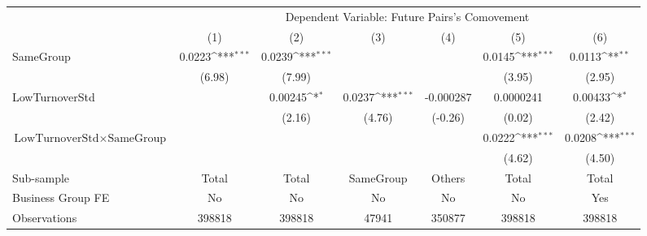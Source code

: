 {
\def\sym#1{\ifmmode^{#1}\else\(^{#1}\)\fi}
\begin{tabular}{l*{6}{c}}
\hline\hline
                &\multicolumn{6}{c}{Dependent Variable:  Future Pairs's Comovement}                                               \\\cmidrule(lr){2-7}
                &\multicolumn{1}{c}{(1)}         &\multicolumn{1}{c}{(2)}         &\multicolumn{1}{c}{(3)}         &\multicolumn{1}{c}{(4)}         &\multicolumn{1}{c}{(5)}         &\multicolumn{1}{c}{(6)}         \\
\hline
SameGroup       &   0.0223\sym{***}&   0.0239\sym{***}&                  &                  &   0.0145\sym{***}&   0.0113\sym{**} \\
                &   (6.98)         &   (7.99)         &                  &                  &   (3.95)         &   (2.95)         \\
[1em]
LowTurnoverStd  &                  &  0.00245\sym{*}  &   0.0237\sym{***}&-0.000287         &0.0000241         &  0.00433\sym{*}  \\
                &                  &   (2.16)         &   (4.76)         &  (-0.26)         &   (0.02)         &   (2.42)         \\
[1em]
$ {\text{LowTurnoverStd} } \times {\text{SameGroup} }  $ &                  &                  &                  &                  &   0.0222\sym{***}&   0.0208\sym{***}\\
                &                  &                  &                  &                  &   (4.62)         &   (4.50)         \\
\hline
Sub-sample      &    Total         &    Total         &SameGroup         &   Others         &    Total         &    Total         \\
Business Group FE&       No         &       No         &       No         &       No         &       No         &      Yes         \\
Observations    &   398818         &   398818         &    47941         &   350877         &   398818         &   398818         \\
\hline\hline  \end{tabular}}
